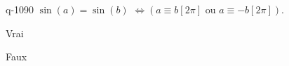 \begin{truefalse}{q-1090}
$\sin(a)=\sin(b)$  $\Leftrightarrow \left(a\equiv b [2\pi]\text{ ou } a\equiv -b [2\pi]\right)$.
\item Vrai
\item* Faux
\end{truefalse}

